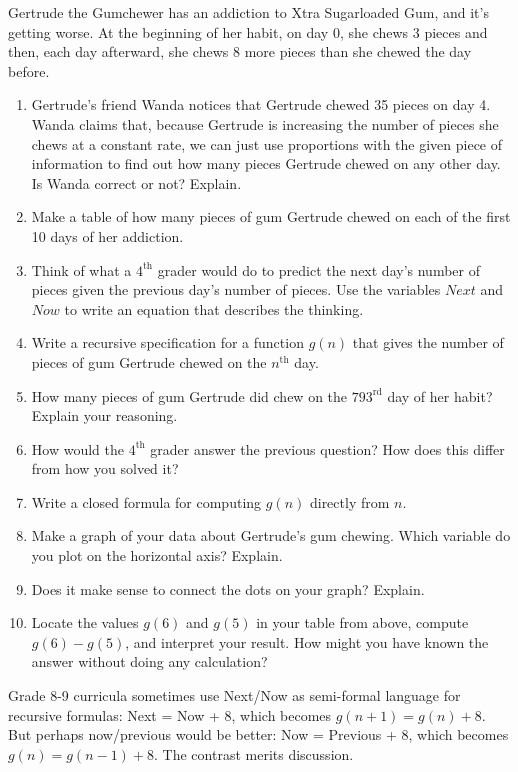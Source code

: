 \documentclass[nooutcomes]{ximera}
\begin{document}
\begin{problem}%
Gertrude the Gumchewer has an addiction to Xtra Sugarloaded Gum, and it's getting worse.  At the beginning of her habit, on day 0, she chews 3 pieces and then, each day afterward, she chews 8 more pieces than she chewed the day before.
\begin{enumerate}
\item Gertrude's friend Wanda notices that Gertrude chewed 35 pieces on day 4.  Wanda claims that, because Gertrude is increasing the number of pieces she chews at a constant rate, we can just use proportions with the given piece of information to find out how many pieces Gertrude chewed on any other day.  Is Wanda correct or not?  Explain. 
\item Make a table of how many pieces of gum Gertrude chewed on each of the first 10 days of her addiction.  
\item Think of what a $4^\mathrm{th}$ grader would do to predict the next day's number of pieces given the previous day's number of pieces.  Use the variables $Next$ and $Now$ to write an equation that describes the thinking.
\item Write a recursive specification for a function $g(n)$ that gives the number of pieces of gum Gertrude chewed on the $n^\mathrm{th}$ day.  
\item How many pieces of gum Gertrude did chew on the $793^\mathrm{rd}$ day of her habit?  Explain your reasoning.  
\item How would the $4^\mathrm{th}$ grader answer the previous question?  How does this differ from how you solved it?
\item Write a closed formula for computing $g(n)$ directly from $n$.  
\item Make a graph of your data about Gertrude's gum chewing.  Which variable do you plot on the horizontal axis?  Explain.  
\item Does it make sense to connect the dots on your graph?  Explain.  
\item  Locate the values $g(6)$ and $g(5)$ in your table from above, compute  $g(6) - g(5)$, and interpret your result.  How might you have known the answer without doing any calculation?  
\end{enumerate}
\begin{teachingnote}
Grade 8-9 curricula sometimes use Next/Now as semi-formal language for recursive formulas: Next = Now + 8, which becomes $g(n+1) = g(n)+8$. But perhaps now/previous would be better: Now = Previous + 8, which becomes $g(n) = g(n-1) + 8$. The contrast merits discussion.
\end{teachingnote}
\end{problem}
\end{document}
